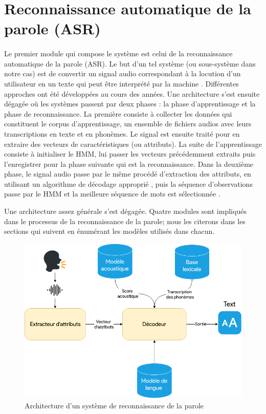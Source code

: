 \section{Reconnaissance automatique de la parole (ASR)}
\paragraph{}
Le premier module qui compose le système est celui de la reconnaissance automatique de la parole (ASR). Le but d'un tel système (ou sous-système dans notre cas) est de convertir un signal audio correspondant à la locution d'un utilisateur en un texte qui peut être interprété par la machine \citep{asr_definition}. Différentes approches ont été développées au cours des années. Une architecture s'est ensuite dégagée où les systèmes passent par deux phases : la phase d'apprentissage et la phase de reconnaissance. La première consiste à collecter les données qui constituent le corpus d'apprentissage, un ensemble de fichiers audios avec leurs transcriptions en texte et en phonèmes. Le signal est ensuite traité pour en extraire des vecteurs de caractéristiques (ou attributs). La suite de l'apprentissage consiste à initialiser le HMM, lui passer les vecteurs précédemment extraits puis l'enregistrer pour la phase suivante qui est la reconnaissance. Dans la deuxième phase, le signal audio passe par le même procédé d'extraction des attributs, en utilisant un algorithme de décodage approprié \citep{viterbi_hmm}, puis la séquence d'observations passe par le HMM et la meilleure séquence de mots est sélectionnée \citep{speech_reco_Yu2015}.
\par Une architecture assez générale s'est dégagée. Quatre modules sont impliqués dans le processus de la reconnaissance de la parole; nous les citerons dans les sections qui suivent en énumérant les modèles utilisés dans chacun.

\begin{figure}[H]
	\centering
	\label{ASRSchema}
	\includegraphics[width=0.70\linewidth]{images/ASR/schema.png}
	\caption{Architecture d'un système de reconnaissance de la parole \citep{speech_reco_Yu2015}}
\end{figure}


